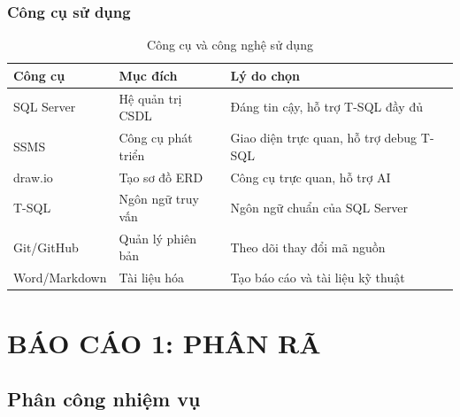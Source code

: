 \documentclass[12pt,a4paper]{article}
\begin{document}
\subsubsection{Công cụ sử dụng}

\begin{table}[H]
\centering
\caption{Công cụ và công nghệ sử dụng}
\begin{tabular}{@{}|l|l|l|@{}}
\hline
\textbf{Công cụ} & \textbf{Mục đích} & \textbf{Lý do chọn} \\ \hline
SQL Server & Hệ quản trị CSDL & Đáng tin cậy, hỗ trợ T-SQL đầy đủ \\ \hline
SSMS & Công cụ phát triển & Giao diện trực quan, hỗ trợ debug T-SQL \\ \hline
draw.io & Tạo sơ đồ ERD & Công cụ trực quan, hỗ trợ AI \\ \hline
T-SQL & Ngôn ngữ truy vấn & Ngôn ngữ chuẩn của SQL Server \\ \hline
Git/GitHub & Quản lý phiên bản & Theo dõi thay đổi mã nguồn \\ \hline
Word/Markdown & Tài liệu hóa & Tạo báo cáo và tài liệu kỹ thuật \\ \hline
\end{tabular}
\end{table}

\section{BÁO CÁO 1: PHÂN RÃ}

\subsection{Phân công nhiệm vụ}
\end{document}

